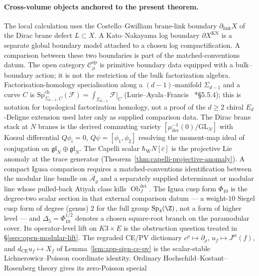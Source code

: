 \documentclass[11pt]{memoir}
\begin{document}
\paragraph{Cross-volume objects anchored to the present theorem.}
The local calculation uses the Costello--Gwilliam brane-link boundary
\(\partial_{\mathrm{link}}X\) of the Dirac brane defect
\(L\subset X\).  A Kato--Nakayama log boundary
\(\partial X^{\mathrm{KN}}\) is a separate global boundary model
attached to a chosen log compactification.  A comparison between these
two boundaries is part of the matched-conventions datum.  The open
category \(\mathcal C^{\mathrm{op}}_\partial\) is primitive boundary
data equipped with a bulk--boundary action; it is not the restriction
of the bulk factorization algebra.  Factorisation-homology
specialisation along a $(d-1)$-manifold $\Sigma_{d-1}$ and a curve
$C$ is
$\mathrm{Sp}^{\mathrm{ch}}_{\Sigma_{d-1},C}(\mathcal F)=
\int_{\Sigma_{d-1}}\mathcal F|_C$
(Lurie--Ayala--Francis
~\cite{lurie-ha}*{\S 5.5.4}\cite{ayala-francis}); this is notation for
topological factorization homology, not a proof of the \(d\geq2\)
chiral \(E_d\)-Deligne extension used later only as supplied comparison
data.  The Dirac brane stack at $N$ branes is the
derived commuting variety
$[\mu^{-1}_{\mathrm{der}}(0)/\mathrm{GL}_N]$ with Koszul
differential $Q\phi_i=0$, $Q\psi=[\phi_1,\phi_2]$ resolving the
moment-map ideal of conjugation on
	$\mathfrak{gl}_N\oplus\mathfrak{gl}_N$.  The Capelli scalar
	\(\hbar_{\mathrm{W}}N[\bar c]\) is the projective Lie anomaly at the trace generator
	(Theorem~\ref{thm:capelli-projective-anomaly}).  A
compact Igusa comparison requires a matched-conventions identification
between the modular line bundle on \(\overline{\mathcal A}_g\) and a
separately supplied determinant or modular line whose pulled-back
Atiyah class kills \(\operatorname{Ob}^{\det}_J\).  The Igusa cusp form
\(\Phi_{10}\)
is the degree-two scalar section in that external comparison datum
--- a weight-\(10\) Siegel cusp form of degree (genus) \(2\) for the
full group \(\mathrm{Sp}_4(\Z)\), not a form of higher level --- and
\(\Delta_5=\Phi_{10}^{1/2}\) denotes a chosen square-root branch on
the paramodular cover.  Its operator-level lift on \(K3\times E\) is
the obstruction question treated in
  \S\ref{ssec:open-modular-lift}.  The regraded CE/PV dictionary
\(c^\rho\mapsto\partial_\rho\),
\(u_f\mapsto J^{\mathrm{st}}(f)\), and
\(d_{\mathrm{CE}}u_f\mapsto X_f\) of
Lemma~\ref{lem:app-sign-ce-pv} is the scalar-stable
Lichnerowicz--Poisson coordinate identity.  Ordinary
Hochschild--Kostant--Rosenberg theory gives its zero-Poisson special
\end{document}
